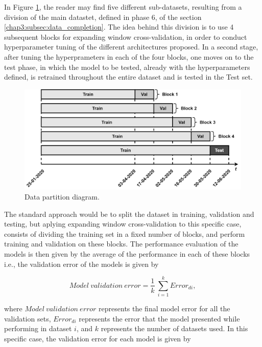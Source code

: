 In Figure \ref{partition}, the reader may find five different sub-datasets, resulting from a division of the main datastet, defined in phase 6, of the section \ref{chap3:subsec:data_completion}. The idea behind this division is to use 4 subsequent blocks for expanding window cross-validation, in order to conduct hyperparameter tuning of the different architectures proposed. In a second stage, after tuning the hyperprameters in each of the four blocks, one moves on to the test phase, in which the model to be tested, already with the hyperparameters defined, is retrained throughout the entire dataset and is tested in the Test set.

\begin{figure}[h!]
    \centering
    \begin{center}
    \includegraphics[width=1\textwidth]{Images/data_partition.png}
    \caption{Data partition diagram.}
    \label{partition}
    \end{center}
\end{figure}

The standard approach would be to split the dataset in training, validation and testing, but aplying expanding window cross-validation to this specific case, consists of dividing the training set in a fixed number of blocks, and perform training and validation on these blocks. The performance evaluation of the models is then given by the average of the performance in each of these blocks i.e., the validation error of the models is given by

\begin{equation}
     Model\ validation\ error =\frac {1}{k}\ \sum_{i=1}^k Error_{di},
\label{err_av}
\end{equation}

where $Model\ validation\ error$ represents the final model error for all the validation sets, $Error_{di}$ represents the error that the model presented while performing in dataset $i$, and $k$ represents the number of datasets used.
In this specific case, the validation error for each model is given by

